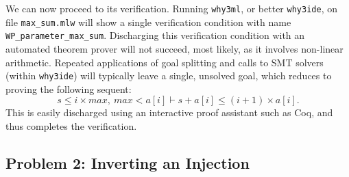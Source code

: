 We can now proceed to its verification.
Running \texttt{why3ml}, or better \texttt{why3ide}, on file
\verb|max_sum.mlw| will show a single verification condition with name
\verb|WP_parameter_max_sum|.
Discharging this verification condition with an automated theorem
prover will not succeed, most likely, as it involves non-linear
arithmetic. Repeated applications of goal splitting and calls to
SMT solvers (within \texttt{why3ide}) will typically leave a single,
unsolved goal, which reduces to proving the following sequent:
\begin{displaymath}
  s \le i \times max, ~ max < a[i] \vdash s + a[i] \le (i+1) \times a[i].
\end{displaymath}
This is easily discharged using an interactive proof assistant such as
Coq, and thus completes the verification.

\subsection{Problem 2: Inverting an Injection}

